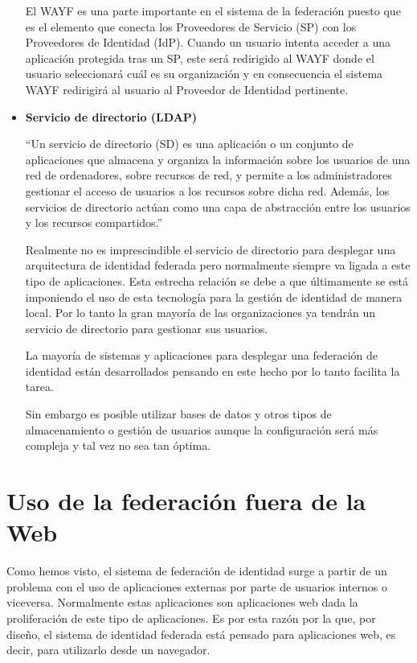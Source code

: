 \begin{itemize}
    El WAYF es una parte importante en el sistema de la federación
    puesto que es el elemento que conecta los Proveedores de
    Servicio (SP) con los Proveedores de Identidad (IdP). Cuando un
    usuario intenta acceder a una aplicación protegida tras un SP,
    este será redirigido al WAYF donde el usuario seleccionará cuál
    es su organización y en consecuencia el sistema WAYF redirigirá
    al usuario al Proveedor de Identidad pertinente.

            \item \textbf{Servicio de directorio (LDAP)}

    ``Un servicio de directorio (SD) es una aplicación o un conjunto
    de aplicaciones que almacena y organiza la información sobre los
    usuarios de una red de ordenadores, sobre recursos de red, y
    permite a los administradores gestionar el acceso de usuarios a
    los recursos sobre dicha red. Además, los servicios de directorio
    actúan como una capa de abstracción entre los usuarios y los
    recursos compartidos.''

    Realmente no es imprescindible el servicio de directorio para
    desplegar una arquitectura de identidad federada pero normalmente
    siempre va ligada a este tipo de aplicaciones. Esta estrecha
    relación se debe a que últimamente se está imponiendo el uso de
    esta tecnología para la gestión de identidad de manera local. Por
    lo tanto la gran mayoría de las organizaciones ya tendrán un
    servicio de directorio para gestionar sus usuarios.

    La mayoría de sistemas y aplicaciones para desplegar una
    federación de identidad están desarrollados pensando en este
    hecho por lo tanto facilita la tarea.

    Sin embargo es posible utilizar bases de datos y otros tipos de
    almacenamiento o gestión de usuarios aunque la configuración será
    más compleja y tal vez no sea tan óptima.

            \end{itemize}

    \section{Uso de la federación fuera de la Web}

    Como hemos visto, el sistema de federación de identidad surge a partir
    de un problema con el uso de aplicaciones externas por parte de
    usuarios internos o viceversa. Normalmente estas aplicaciones son
    aplicaciones web dada la proliferación de este tipo de aplicaciones.
    Es por esta razón por la que, por diseño, el sistema de identidad
    federada está pensado para aplicaciones web, es decir, para utilizarlo
    desde un navegador.

